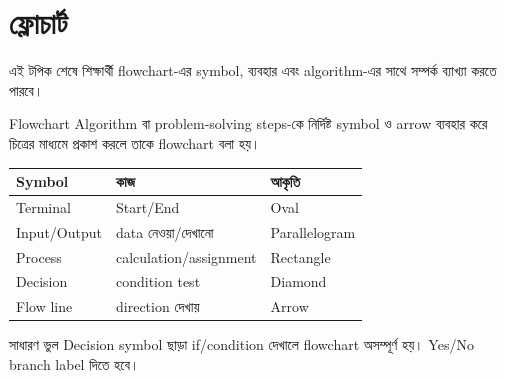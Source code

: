 \section{ফ্লোচার্ট}

\begin{learningbox}
এই টপিক শেষে শিক্ষার্থী flowchart-এর symbol, ব্যবহার এবং algorithm-এর সাথে সম্পর্ক ব্যাখ্যা করতে পারবে।
\end{learningbox}

\begin{definitionbox}{Flowchart}
Algorithm বা problem-solving steps-কে নির্দিষ্ট symbol ও arrow ব্যবহার করে চিত্রের মাধ্যমে প্রকাশ করলে তাকে flowchart বলা হয়।
\end{definitionbox}

\begin{center}
\begin{tabular}{|p{}|p{}|p{}|}
\hline
\textbf{Symbol} & \textbf{কাজ} & \textbf{আকৃতি} \\
\hline
Terminal & Start/End & Oval \\
\hline
Input/Output & data নেওয়া/দেখানো & Parallelogram \\
\hline
Process & calculation/assignment & Rectangle \\
\hline
Decision & condition test & Diamond \\
\hline
Flow line & direction দেখায় & Arrow \\
\hline
\end{tabular}
\end{center}

\begin{center}
\end{center}

\begin{mistakebox}{সাধারণ ভুল}
Decision symbol ছাড়া if/condition দেখালে flowchart অসম্পূর্ণ হয়। Yes/No branch label দিতে হবে।
\end{mistakebox}

